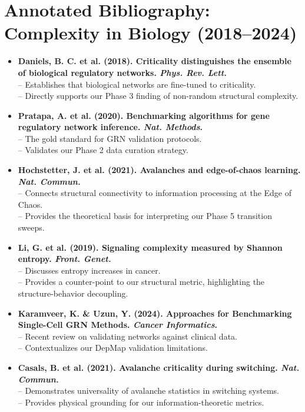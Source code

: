 \documentclass[11pt]{article}
\begin{document}
\section*{Annotated Bibliography: Complexity in Biology (2018--2024)}
\begin{itemize}
    \item \textbf{Daniels, B. C. et al. (2018). Criticality distinguishes the ensemble of biological regulatory networks. \textit{Phys. Rev. Lett.}} \\
    -- Establishes that biological networks are fine-tuned to criticality.\\
    -- Directly supports our Phase 3 finding of non-random structural complexity.
    
    \item \textbf{Pratapa, A. et al. (2020). Benchmarking algorithms for gene regulatory network inference. \textit{Nat. Methods}.} \\
    -- The gold standard for GRN validation protocols.\\
    -- Validates our Phase 2 data curation strategy.
    
    \item \textbf{Hochstetter, J. et al. (2021). Avalanches and edge-of-chaos learning. \textit{Nat. Commun.}} \\
    -- Connects structural connectivity to information processing at the Edge of Chaos.\\
    -- Provides the theoretical basis for interpreting our Phase 5 transition sweeps.
    
    \item \textbf{Li, G. et al. (2019). Signaling complexity measured by Shannon entropy. \textit{Front. Genet.}} \\
    -- Discusses entropy increases in cancer.\\
    -- Provides a counter-point to our structural metric, highlighting the structure-behavior decoupling.
    
    \item \textbf{Karamveer, K. \& Uzun, Y. (2024). Approaches for Benchmarking Single-Cell GRN Methods. \textit{Cancer Informatics}.} \\
    -- Recent review on validating networks against clinical data.\\
    -- Contextualizes our DepMap validation limitations.

    \item \textbf{Casals, B. et al. (2021). Avalanche criticality during switching. \textit{Nat. Commun.}} \\
    -- Demonstrates universality of avalanche statistics in switching systems.\\
    -- Provides physical grounding for our information-theoretic metrics.


\end{itemize}
\end{document}
